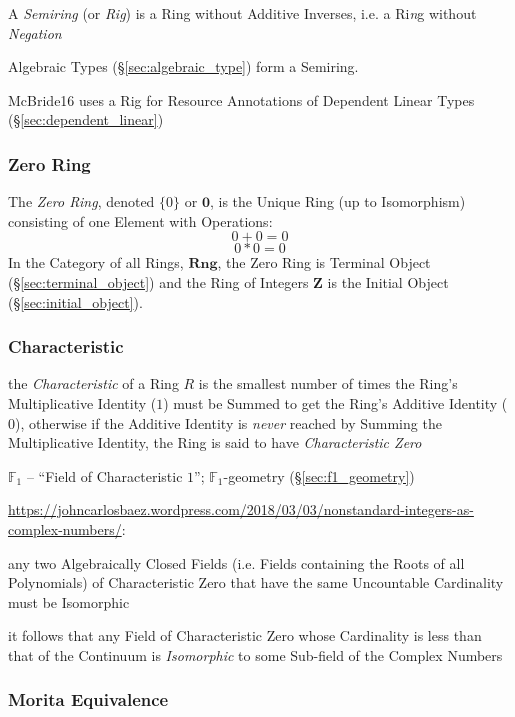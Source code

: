 \begin{itemize}
A \emph{Semiring} (or \emph{Rig}) is a Ring without Additive Inverses,
i.e. a Ri\emph{n}g without \emph{Negation}

Algebraic Types (\S\ref{sec:algebraic_type}) form a Semiring.

McBride16 uses a Rig for Resource Annotations of Dependent Linear
Types (\S\ref{sec:dependent_linear})



\subsubsection{Zero Ring}\label{sec:zero_ring}

The \emph{Zero Ring}, denoted $\{0\}$ or $\mathbf{0}$, is the Unique Ring
(up to Isomorphism) consisting of one Element with Operations:
\[
    0 + 0 = 0
\] \[
    0 * 0 = 0
\]
In the Category of all Rings, $\mathbf{Rng}$, the Zero Ring is
Terminal Object (\S\ref{sec:terminal_object}) and the Ring of Integers
$\mathbf{Z}$ is the Initial Object (\S\ref{sec:initial_object}).



\subsubsection{Characteristic}\label{sec:ring_characteristic}

the \emph{Characteristic} of a Ring $R$ is the smallest number of times the
Ring's Multiplicative Identity ($1$) must be Summed to get the Ring's Additive
Identity ($0$), otherwise if the Additive Identity is \emph{never} reached by
Summing the Multiplicative Identity, the Ring is said to have
\emph{Characteristic Zero}

\fist $\mathbb{F}_1$ -- ``Field of Characteristic $1$''; $\mathbb{F}_1$-geometry
(\S\ref{sec:f1_geometry})

\url{https://johncarlosbaez.wordpress.com/2018/03/03/nonstandard-integers-as-complex-numbers/}:

any two Algebraically Closed Fields (i.e. Fields containing the Roots of all
Polynomials) of Characteristic Zero that have the same Uncountable Cardinality
must be Isomorphic

it follows that any Field of Characteristic Zero whose Cardinality is less than
that of the Continuum is \emph{Isomorphic} to some Sub-field of the Complex
Numbers



\subsubsection{Morita Equivalence}\label{sec:morita_equivalence}


\end{itemize}
